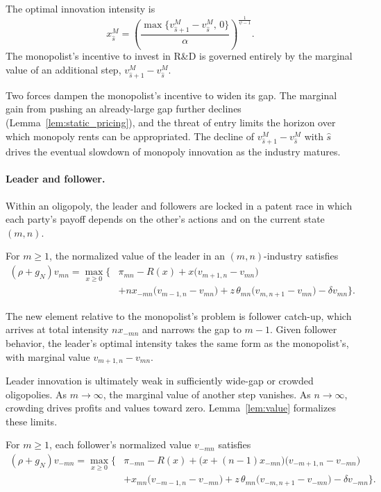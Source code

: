 \documentclass[12pt]{article}
\begin{document}
The optimal innovation intensity is
\[x^M_{\hat{s}}
=
\left(
  \frac{\max\{v^M_{\hat{s}+1} - v^M_{\hat{s}},\,0\}}{\alpha}
\right)^{\frac{1}{\psi-1}}.\]
The monopolist's incentive to invest in R\&D is governed entirely by the marginal value of an additional step, \(v^M_{\hat{s}+1} - v^M_{\hat{s}}\).

Two forces dampen the monopolist's incentive to widen its gap. The marginal gain from pushing an already-large gap further declines (Lemma~\ref{lem:static_pricing}), and the threat of entry limits the horizon over which monopoly rents can be appropriated. The decline of \(v^M_{\hat{s}+1} - v^M_{\hat{s}}\) with \(\hat{s}\) drives the eventual slowdown of monopoly innovation as the industry matures.

\paragraph{Leader and follower.}

Within an oligopoly, the leader and followers are locked in a patent race in which each party's payoff depends on the other's actions and on the current state \((m,n)\).

For \(m\geq1\), the normalized value of the leader in an \((m,n)\)-industry satisfies
\begin{align}
    (\rho + g_N)v_{mn} = \max_{ x \ge 0} \Big\{& \pi_{mn}
                        - R(x) + x\big(v_{m+1,n} - v_{mn}\big)\nonumber\\
                        & + n x_{-mn}\big(v_{m-1,n} - v_{mn}\big) + z\,\theta_{mn}\big(v_{m,n+1} - v_{mn}\big) - \delta v_{mn} \Big\}. \label{eq:valuel}
\end{align}

The new element relative to the monopolist's problem is follower catch-up, which arrives at total intensity \(n x_{-mn}\) and narrows the gap to \(m-1\). Given follower behavior, the leader's optimal intensity takes the same form as the monopolist's, with marginal value \(v_{m+1,n}-v_{mn}\).

Leader innovation is ultimately weak in sufficiently wide-gap or crowded oligopolies. As \(m\to\infty\), the marginal value of another step vanishes. As \(n\to\infty\), crowding drives profits and values toward zero. Lemma~\ref{lem:value} formalizes these limits.

For \(m\geq1\), each follower's normalized value \(v_{-mn}\) satisfies
\begin{align}
    (\rho + g_N)v_{-mn} = \max_{x \ge 0} \Big\{& \pi_{-mn}
                          - R(x) + \big(x + (n-1)x_{-mn}\big)\big(v_{-m+1,n} - v_{-mn}\big) \nonumber\\
                          & + x_{mn}\big(v_{-m-1,n} - v_{-mn}\big)
                          + z\,\theta_{mn}\big(v_{-m,n+1} - v_{-mn}\big)
                          - \delta v_{-mn} \Big\}. \label{eq:valuef}
\end{align}
\end{document}

